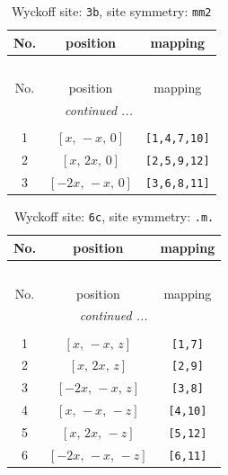 \documentclass[fleqn,8pt]{jsarticle}
\begin{document}
\begin{longtable}{ccc}
\caption{Wyckoff site: {\tt 3b}, site symmetry: {\tt mm2}}
 \\
 \hline \hline
No. & position & mapping \\ \hline \endfirsthead

\multicolumn{2}{l}{\tablename\ \thetable{}} \\
 \hline \hline
No. & position & mapping \\ \hline \endhead

 \hline \hline
\multicolumn{2}{r}{\footnotesize\it continued ...} \\ \endfoot

 \hline \hline
\multicolumn{2}{r}{} \\ \endlastfoot

1 & $\left[ x,\, - x,\, 0 \right]$ & {\tt [1,4,7,10]} \\ \hline
2 & $\left[ x,\, 2 x,\, 0 \right]$ & {\tt [2,5,9,12]} \\ \hline
3 & $\left[ - 2 x,\, - x,\, 0 \right]$ & {\tt [3,6,8,11]} \\
\end{longtable}
\renewcommand{\arraystretch}{1.2}
\begin{longtable}{ccc}
\caption{Wyckoff site: {\tt 6c}, site symmetry: {\tt .m.}}
 \\
 \hline \hline
No. & position & mapping \\ \hline \endfirsthead

\multicolumn{2}{l}{\tablename\ \thetable{}} \\
 \hline \hline
No. & position & mapping \\ \hline \endhead

 \hline \hline
\multicolumn{2}{r}{\footnotesize\it continued ...} \\ \endfoot

 \hline \hline
\multicolumn{2}{r}{} \\ \endlastfoot

1 & $\left[ x,\, - x,\, z \right]$ & {\tt [1,7]} \\ \hline
2 & $\left[ x,\, 2 x,\, z \right]$ & {\tt [2,9]} \\ \hline
3 & $\left[ - 2 x,\, - x,\, z \right]$ & {\tt [3,8]} \\ \hline
4 & $\left[ x,\, - x,\, - z \right]$ & {\tt [4,10]} \\ \hline
5 & $\left[ x,\, 2 x,\, - z \right]$ & {\tt [5,12]} \\ \hline
6 & $\left[ - 2 x,\, - x,\, - z \right]$ & {\tt [6,11]} \\
\end{longtable}
\end{document}
